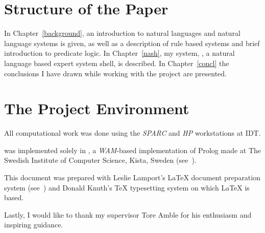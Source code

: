 \section{Structure of the Paper}

In Chapter~\ref{background}, an introduction to natural languages and
natural language systems is given, as well as a description of rule
based systems and brief introduction to predicate logic. In
Chapter~\ref{nash}, my system, {\nash}, a natural language based
expert system shell, is described. In Chapter~\ref{concl} the
conclusions I have drawn while working with the project are presented.

\section{The Project Environment}

All computational work was done using the {\em SPARC\/} and {\em HP\/}
workstations at IDT.

{\nash} was implemented solely in {\SICStus}, a {\em WAM\/}-based
implementation of Prolog made at The Swedish Institute of Computer
Science, Kista, Sweden (see~\cite{sicstus}).

This document was prepared with Leslie Lamport's {\LaTeX} document
preparation system (see~\cite{lamport}) and Donald Knuth's {\TeX}
typesetting system on which {\LaTeX} is based.

Lastly, I would like to thank my supervisor Tore Amble for his
enthusiasm and inspiring guidance.
